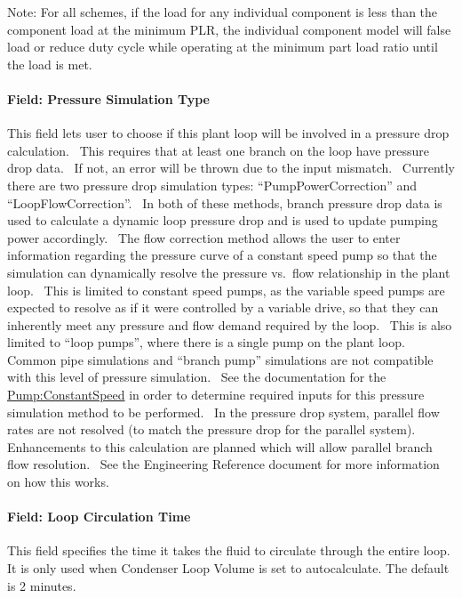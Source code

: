 Note: For all schemes, if the load for any individual component is less than the component load at the minimum PLR, the individual component model will false load or reduce duty cycle while operating at the minimum part load ratio until the load is met.

\paragraph{Field: Pressure Simulation Type}\label{field-pressure-simulation-type-1}

This field lets user to choose if this plant loop will be involved in a pressure drop calculation.~ This requires that at least one branch on the loop have pressure drop data.~ If not, an error will be thrown due to the input mismatch.~ Currently there are two pressure drop simulation types: ``PumpPowerCorrection'' and ``LoopFlowCorrection''.~ In both of these methods, branch pressure drop data is used to calculate a dynamic loop pressure drop and is used to update pumping power accordingly.~ The flow correction method allows the user to enter information regarding the pressure curve of a constant speed pump so that the simulation can dynamically resolve the pressure vs.~flow relationship in the plant loop.~ This is limited to constant speed pumps, as the variable speed pumps are expected to resolve as if it were controlled by a variable drive, so that they can inherently meet any pressure and flow demand required by the loop.~ This is also limited to ``loop pumps'', where there is a single pump on the plant loop.~ Common pipe simulations and ``branch pump'' simulations are not compatible with this level of pressure simulation.~ See the documentation for the \hyperref[pumpconstantspeed]{Pump:ConstantSpeed} in order to determine required inputs for this pressure simulation method to be performed.~ In the pressure drop system, parallel flow rates are not resolved (to match the pressure drop for the parallel system).~ Enhancements to this calculation are planned which will allow parallel branch flow resolution.~ See the Engineering Reference document for more information on how this works.

\paragraph{Field: Loop Circulation Time}\label{field-pressure-simulation-type}

This field specifies the time it takes the fluid to circulate through the entire loop. It is only used when Condenser Loop Volume is set to autocalculate. The default is 2 minutes.

